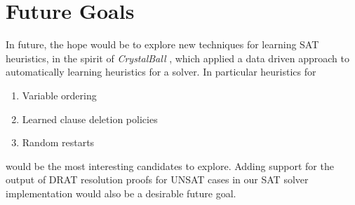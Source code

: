 \documentclass[12pt]{article}
\begin{document}
\section{Future Goals}

In future, the hope would be to explore new techniques for learning SAT heuristics, in the spirit of \textit{CrystalBall} \cite{2019sooscrystalball}, which applied a data driven approach to automatically learning heuristics for a solver. In particular heuristics for
\begin{enumerate}
    \item Variable ordering
    \item Learned clause deletion policies
    \item Random restarts
\end{enumerate}
would be the most interesting candidates to explore. Adding support for the output of DRAT resolution proofs \cite{2014dratproofs} for UNSAT cases in our SAT solver implementation would also be a desirable future goal.



\end{document}
